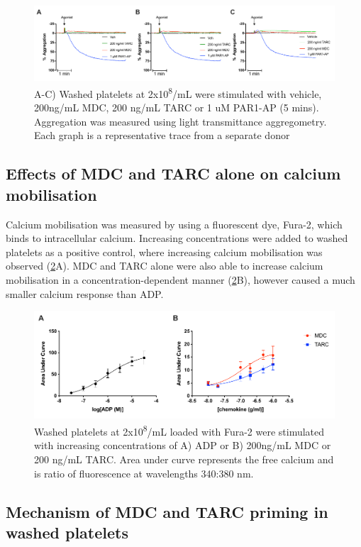 \documentclass[11pt,twoside]{bristolthesis}
\begin{document}
\begin{figure}
\includegraphics[width=0.9\linewidth]{figure/Chemokines/Layouts/MDC_TARC_alone_wp_aggregation} \caption[The effect of the chemokines MDC and TARC alone on aggregation in washed platelets]{A-C) Washed platelets at 2x10\textsuperscript{8}/mL were stimulated with vehicle, 200ng/mL MDC, 200 ng/mL TARC or 1 uM PAR1-AP (5 mins). Aggregation was measured using light transmittance aggregometry. Each graph is a representative trace from a separate donor}\label{fig:MDC-TARC-wp-alone-aggregation}
\end{figure}
\hypertarget{effects-of-mdc-and-tarc-alone-on-calcium-mobilisation}{%
\subsection{Effects of MDC and TARC alone on calcium mobilisation}\label{effects-of-mdc-and-tarc-alone-on-calcium-mobilisation}}

Calcium mobilisation was measured by using a fluorescent dye, Fura-2, which binds to intracellular calcium. Increasing concentrations were added to washed platelets as a positive control, where increasing calcium mobilisation was observed (\ref{fig:MDC-TARC-wp-calcium}A). MDC and TARC alone were also able to increase calcium mobilisation in a concentration-dependent manner (\ref{fig:MDC-TARC-wp-calcium}B), however caused a much smaller calcium response than ADP.



\begin{figure}
\includegraphics[width=0.9\linewidth]{figure/Chemokines/Layouts/MDC_TARC_calcium_wp} \caption[The effect of ADP and the chemokines MDC and TARC alone on calcium mobilisation in washed platelets.]{Washed platelets at 2x10\textsuperscript{8}/mL loaded with Fura-2 were stimulated with increasing concentrations of A) ADP or B) 200ng/mL MDC or 200 ng/mL TARC. Area under curve represents the free calcium and is ratio of fluorescence at wavelengths 340:380 nm.}\label{fig:MDC-TARC-wp-calcium}
\end{figure}
\hypertarget{mechanism-of-mdc-and-tarc-priming-in-washed-platelets}{%
\subsection{Mechanism of MDC and TARC priming in washed platelets}\label{mechanism-of-mdc-and-tarc-priming-in-washed-platelets}}
\end{document}
